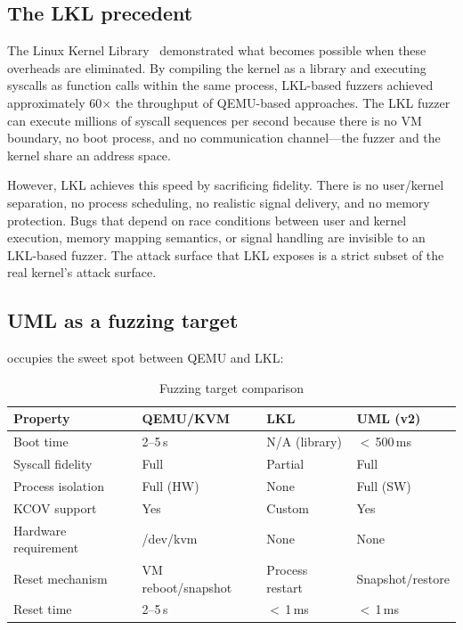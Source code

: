 \subsection{The LKL precedent}

The Linux Kernel Library~\cite{lkl,purdila2010} demonstrated what
becomes possible when these overheads are eliminated.  By compiling the
kernel as a library and executing syscalls as function calls within the
same process, LKL-based fuzzers achieved approximately 60$\times$ the
throughput of QEMU-based approaches.  The LKL fuzzer can execute millions
of syscall sequences per second because there is no VM boundary, no boot
process, and no communication channel---the fuzzer and the kernel share
an address space.

However, LKL achieves this speed by sacrificing fidelity.  There is no
user/kernel separation, no process scheduling, no realistic signal
delivery, and no memory protection.  Bugs that depend on race conditions
between user and kernel execution, memory mapping semantics, or signal
handling are invisible to an LKL-based fuzzer.  The attack surface that
LKL exposes is a strict subset of the real kernel's attack surface.

\subsection{UML as a fuzzing target}

\UML{} occupies the sweet spot between QEMU and LKL:

\begin{table}[ht]
\centering
\caption{Fuzzing target comparison}
\label{tab:fuzz-comparison}
\begin{tabularx}{\textwidth}{l Y Y Y}
\toprule
\textbf{Property}  & \textbf{QEMU/KVM} & \textbf{LKL} & \textbf{UML (v2)} \\
\midrule
Boot time         & 2--5\,s           & N/A (library)    & $<$\,500\,ms \\
Syscall fidelity  & Full              & Partial          & Full \\
Process isolation & Full (HW)         & None             & Full (SW) \\
KCOV support      & Yes               & Custom           & Yes \\
Hardware requirement & /dev/kvm       & None             & None \\
Reset mechanism   & VM reboot/snapshot & Process restart & Snapshot/restore \\
Reset time        & 2--5\,s           & $<$\,1\,ms       & $<$\,1\,ms \\
\bottomrule
\end{tabularx}
\end{table}

